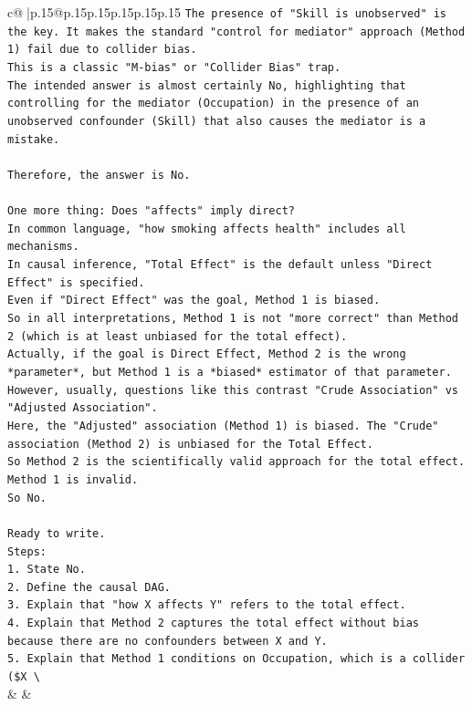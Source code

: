 \documentclass{article}
\begin{document}
{\begin{supertabular}{c@{$\;$}|p{.15\linewidth}@{}p{.15\linewidth}p{.15\linewidth}p{.15\linewidth}p{.15\linewidth}p{.15\linewidth}}
{{{\texttt{The presence of "Skill is unobserved" is the key. It makes the standard "control for mediator" approach (Method 1) fail due to collider bias.} \\
\texttt{This is a classic "M{-}bias" or "Collider Bias" trap.} \\
\texttt{The intended answer is almost certainly No, highlighting that controlling for the mediator (Occupation) in the presence of an unobserved confounder (Skill) that also causes the mediator is a mistake.} \\
\\ 
\texttt{Therefore, the answer is No.} \\
\\ 
\texttt{One more thing: Does "affects" imply direct?} \\
\texttt{In common language, "how smoking affects health" includes all mechanisms.} \\
\texttt{In causal inference, "Total Effect" is the default unless "Direct Effect" is specified.} \\
\texttt{Even if "Direct Effect" was the goal, Method 1 is biased.} \\
\texttt{So in all interpretations, Method 1 is not "more correct" than Method 2 (which is at least unbiased for the total effect).} \\
\texttt{Actually, if the goal is Direct Effect, Method 2 is the wrong *parameter*, but Method 1 is a *biased* estimator of that parameter.} \\
\texttt{However, usually, questions like this contrast "Crude Association" vs "Adjusted Association".} \\
\texttt{Here, the "Adjusted" association (Method 1) is biased. The "Crude" association (Method 2) is unbiased for the Total Effect.} \\
\texttt{So Method 2 is the scientifically valid approach for the total effect.} \\
\texttt{Method 1 is invalid.} \\
\texttt{So No.} \\
\\ 
\texttt{Ready to write.} \\
\texttt{Steps:} \\
\texttt{1. State No.} \\
\texttt{2. Define the causal DAG.} \\
\texttt{3. Explain that "how X affects Y" refers to the total effect.} \\
\texttt{4. Explain that Method 2 captures the total effect without bias because there are no confounders between X and Y.} \\
\texttt{5. Explain that Method 1 conditions on Occupation, which is a collider (\$X \textbackslash{}} \\
            }
        }
    }
    & & \\ \\


\end{supertabular}}
\end{document}
